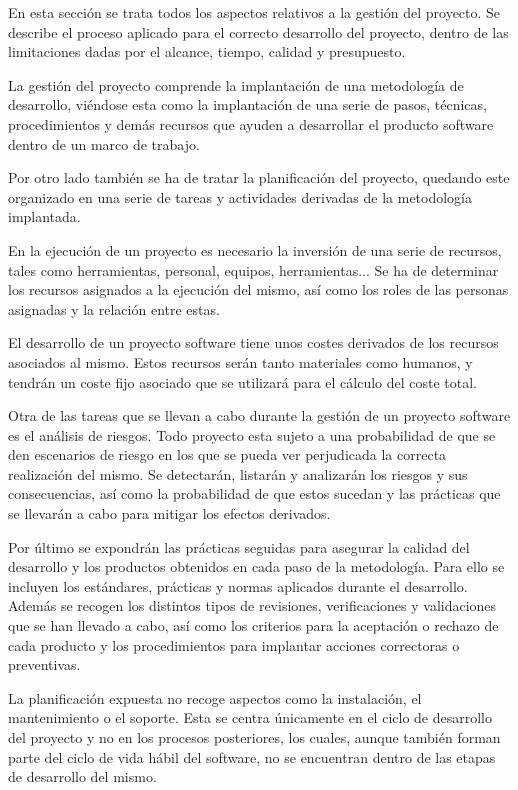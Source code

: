 En esta sección se trata todos los aspectos relativos a la gestión del proyecto. Se describe el
proceso aplicado para el correcto desarrollo del proyecto, dentro de las limitaciones dadas por 
el alcance, tiempo, calidad y presupuesto.

La gestión del proyecto comprende la implantación de una metodología de desarrollo, viéndose 
esta como la implantación de una serie de pasos, técnicas, procedimientos y demás recursos que
ayuden a desarrollar el producto software dentro de un marco de trabajo. 

Por otro lado también se ha de tratar la planificación del proyecto, quedando este organizado en una 
serie de tareas y actividades derivadas de la metodología implantada. 

En la ejecución de un proyecto es necesario la inversión de una serie de recursos, tales como herramientas, 
personal, equipos, herramientas... Se ha de determinar los recursos asignados a la ejecución del mismo, así como los roles 
de las personas asignadas y la relación entre estas.

El desarrollo de un proyecto software tiene unos costes derivados de los recursos asociados al mismo. Estos recursos
serán tanto materiales como humanos, y tendrán un coste fijo asociado que se utilizará para el cálculo del coste total.

Otra de las tareas que se llevan a cabo durante la gestión de un proyecto software es el análisis de riesgos. Todo proyecto 
esta sujeto a una probabilidad de que se den escenarios de riesgo en los que se pueda ver perjudicada la correcta realización del mismo. 
Se detectarán, listarán y analizarán los riesgos y sus consecuencias, así como la probabilidad de que estos sucedan y las prácticas que se llevarán 
a cabo para mitigar los efectos derivados.

Por último se expondrán las prácticas seguidas para asegurar la calidad del desarrollo y los productos obtenidos en cada paso de la
metodología. Para ello se incluyen los estándares, prácticas y normas aplicados durante el desarrollo. Además 
se recogen los distintos tipos de revisiones, verificaciones y validaciones que se han llevado a cabo, así como los criterios 
para la aceptación o rechazo de cada producto y los procedimientos para implantar acciones correctoras o preventivas.

La planificación expuesta no recoge aspectos como la instalación, el mantenimiento o el soporte. Esta se centra únicamente en el ciclo de desarrollo
del proyecto y no en los procesos posteriores, los cuales, aunque también forman parte del ciclo de vida hábil del software, no se encuentran dentro de 
las etapas de desarrollo del mismo.

